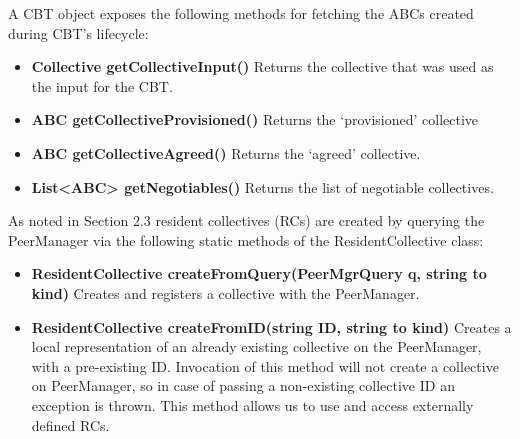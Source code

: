 A CBT object exposes the following methods for fetching the ABCs created during CBT's lifecycle:
\begin{itemize}
\item {\bf Collective getCollectiveInput()} Returns the collective that was used as the input for the CBT.
\item {\bf ABC getCollectiveProvisioned()} Returns the `provisioned' collective
\item {\bf ABC getCollectiveAgreed()} Returns the `agreed' collective.
\item {\bf List<ABC> getNegotiables()} Returns the list of negotiable collectives.
\end{itemize}
As noted in Section 2.3 resident collectives (RCs) are created by querying the PeerManager via the following static methods of the ResidentCollective class:
\begin{itemize}
\item {\bf ResidentCollective createFromQuery(PeerMgrQuery q, string to kind)} Creates and registers a collective with the PeerManager. %
\item {\bf ResidentCollective createFromID(string ID, string to kind)} Creates a local representation of an already existing collective on the PeerManager, with a pre-existing ID. Invocation of this method will not create a collective on PeerManager, so in case of passing a non-existing collective ID an exception is thrown. This method allows us to use and access externally defined RCs. %
\end{itemize}
